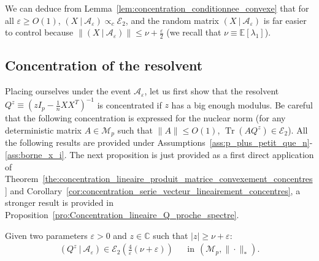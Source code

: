 \documentclass{ws-rmta}
\DeclareMathOperator{\tr}{Tr}
\begin{document}
We can deduce from Lemma~\ref{lem:concentration_conditionnee_convexe} that for all $\varepsilon \geq O(1)$, $(X \ |\ \mathcal A_\varepsilon) \propto_c \mathcal E_2$, and the random matrix $(X \ |\ \mathcal A_\varepsilon)$ is far easier to control because $\|(X \ |\ \mathcal A_\varepsilon)\| \leq \nu + \frac{\varepsilon}{2}$ (we recall that $\nu \equiv \mathbb E[\lambda_1]$).

\subsection{Concentration of the resolvent}
Placing ourselves under the event $\mathcal A_\varepsilon$, let us first show that the resolvent $Q^z \equiv (zI_p - \frac{1}{n}XX^T)^{-1}$ is concentrated if $z$ has a big enough modulus. Be careful that the following concentration is expressed for the nuclear norm (for any deterministic matrix $A \in \mathcal{M}_{p}$ such that $\|A\|\leq O(1)$, $\tr(AQ^z) \in \mathcal E_2$). All the following results are provided under Assumptions~\ref{ass:p_plus_petit_que_n}-\ref{ass:borne_x_i}.
The next proposition is just provided as a first direct application of Theorem~\ref{the:concentration_lineaire_produit_matrice_convexement_concentres} and Corollary~\ref{cor:concentration_serie_vecteur_lineairement_concentres}, a stronger result is provided in Proposition~\ref{pro:Concentration_lineaire_Q_proche_spectre}.
\begin{proposition}\label{pro:concentration_resolvent_concentration_convexe_z_hors_de_boule}
  Given two parameters $\varepsilon>0$ and $z \in \mathbb C$ such that $|z| \geq \nu + \varepsilon$:
  \begin{align*}
    (Q^z \ | \ \mathcal A_\varepsilon) \in \mathcal E_2 \left( \frac{4}{\varepsilon} (\nu + \varepsilon )\right)&
    &\text{in} \ \ (\mathcal M_{p}, \| \cdot \|_*).
  \end{align*}
\end{proposition}
\end{document}
